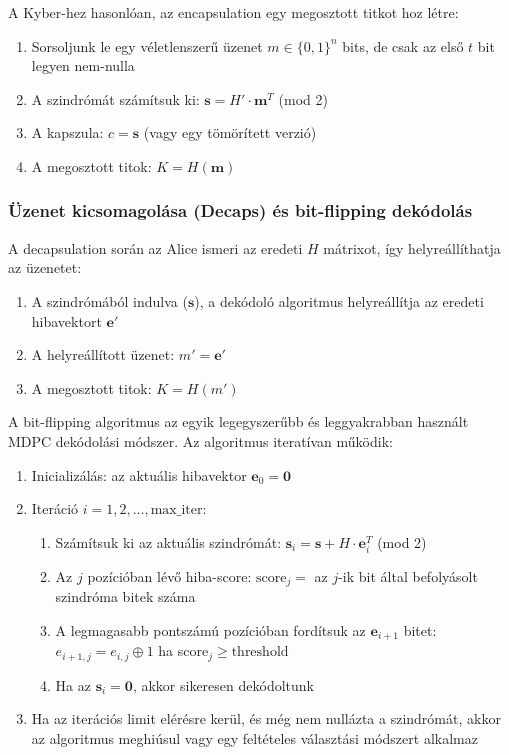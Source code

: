 A Kyber-hez hasonlóan, az encapsulation egy megosztott titkot hoz létre:

\begin{enumerate}
    \item Sorsoljunk le egy véletlenszerű üzenet $m \in \{0,1\}^{n}$ bits, 
        de csak az első $t$ bit legyen nem-nulla
    \item A szindrómát számítsuk ki: $\mathbf{s} = H' \cdot \mathbf{m}^T$ (mod 2)
    \item A kapszula: $c = \mathbf{s}$ (vagy egy tömörített verzió)
    \item A megosztott titok: $K = H(\mathbf{m})$
\end{enumerate}

\subsubsection{Üzenet kicsomagolása (Decaps) és bit-flipping dekódolás}

A decapsulation során az Alice ismeri az eredeti $H$ mátrixot, így helyreállíthatja az üzenetet:

\begin{enumerate}
    \item A szindrómából indulva ($\mathbf{s}$), a dekódoló algoritmus 
        helyreállítja az eredeti hibavektort $\mathbf{e}'$
    \item A helyreállított üzenet: $m' = \mathbf{e}'$
    \item A megosztott titok: $K = H(m')$
\end{enumerate}

A bit-flipping algoritmus az egyik legegyszerűbb és leggyakrabban használt MDPC dekódolási módszer. 
Az algoritmus iteratívan működik:

\begin{enumerate}
    \item Inicializálás: az aktuális hibavektor $\mathbf{e}_0 = \mathbf{0}$
    \item Iteráció $i = 1, 2, \ldots, \text{max\_iter}$:
        \begin{enumerate}
            \item Számítsuk ki az aktuális szindrómát: 
                $\mathbf{s}_i = \mathbf{s} + H \cdot \mathbf{e}_i^T$ (mod 2)
            \item Az $j$ pozícióban lévő hiba-score: 
                $\text{score}_j = $ az $j$-ik bit által befolyásolt szindróma bitek száma
            \item A legmagasabb pontszámú pozícióban fordítsuk az $\mathbf{e}_{i+1}$ bitet: 
                $e_{i+1,j} = e_{i,j} \oplus 1$ ha score$_j \geq \text{threshold}$
            \item Ha az $\mathbf{s}_i = \mathbf{0}$, akkor sikeresen dekódoltunk
        \end{enumerate}
    \item Ha az iterációs limit elérésre kerül, és még nem nullázta a szindrómát, akkor
        az algoritmus meghiúsul vagy egy feltételes választási módszert alkalmaz
\end{enumerate}

